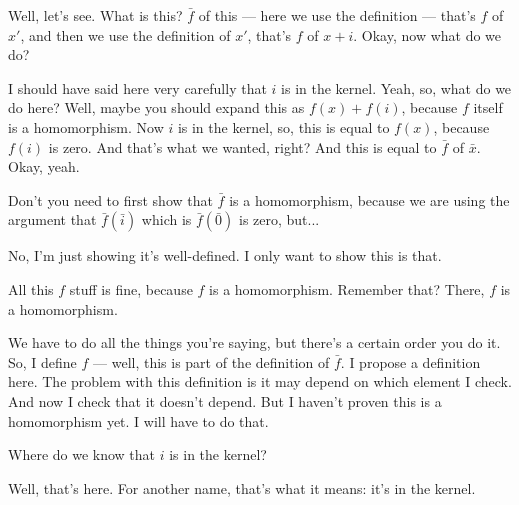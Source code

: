 \begin{proofWrapper}
\begin{speech}[00:55:09 - 00:56:41]
Well, let's see. What is this? $\bar{f}$ of this --- here we use the definition --- that's $f$ of $x'$,  and then we use the definition of $x'$, that's $f$ of $x + i$.  Okay, now what do we do? 

I should have said here very carefully that $i$ is in the kernel.  Yeah, so, what do we do here? Well, maybe you should expand this as $f(x) + f(i)$,  because $f$ itself is a homomorphism. Now $i$ is in the kernel, so, this is equal to $f(x)$,  because $f(i)$ is zero.  And that's what we wanted, right? And this is equal to $\bar{f}$ of $\bar{x}$.  Okay, yeah.
\end{speech}

\begin{student}
Don't you need to first show that $\bar{f}$ is a homomorphism, because we are using the argument that $\bar{f}(\bar{i})$ which is $\bar{f}(\bar{0})$ is zero, but...
\end{student}

\begin{speech}[00:56:55 - 00:57:33]
No, I'm just showing it's well-defined. I only want to show this is that.  

All this $f$ stuff is fine, because $f$ is a homomorphism. Remember that? There, $f$ is a homomorphism.  

We have to do all the things you're saying, but there's a certain order you do it. So, I define $f$ --- well, this is part of the definition of $\bar{f}$. I propose a definition here. The problem with this definition is it may depend on which element I check. And now I check that it doesn't depend. But I haven't proven this is a homomorphism yet. I will have to do that.
\end{speech}

\begin{student}
Where do we know that $i$ is in the kernel?
\end{student}

\begin{speech}[00:57:37 - 00:57:45]
Well, that's here.  For another name, that's what it means: it's in the kernel.
\end{speech}


\end{proofWrapper}
